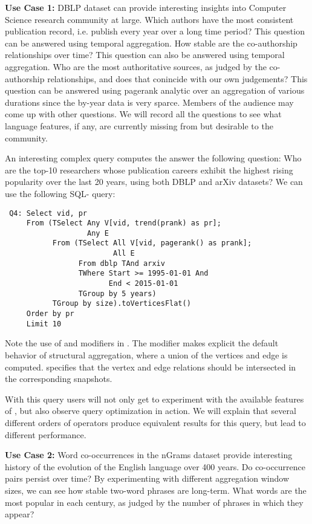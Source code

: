 {\bf Use Case 1:} DBLP dataset can provide interesting insights into
Computer Science research community at large.  Which authors have the
most consistent publication record, i.e. publish every year over a
long time period? This question can be answered using temporal
aggregation.  How stable are the co-authorship relationships over
time? This question can also be answered using temporal aggregation.
Who are the most authoritative sources, as judged by the co-authorship
relationships, and does that conincide with our own judgements?  This
question can be answered using pagerank analytic over an aggregation
of various durations since the by-year data is very sparce.  Members
of the audience may come up with other questions.  We will record all
the questions to see what language features, if any, are currently
missing from \ql but desirable to the community.

An interesting complex query computes the answer the following
question: Who are the top-10 researchers whose publication careers
exhibit the highest rising popularity over the last 20 years, using
both DBLP and arXiv datasets?  We can use the following SQL-\ql
query:

\begin{small}
\begin{verbatim}
 Q4: Select vid, pr
     From (TSelect Any V[vid, trend(prank) as pr];
                   Any E
           From (TSelect All V[vid, pagerank() as prank]; 
                         All E
                 From dblp TAnd arxiv
                 TWhere Start >= 1995-01-01 And
                        End < 2015-01-01
                 TGroup by 5 years)
           TGroup by size).toVerticesFlat()
     Order by pr
     Limit 10
\end{verbatim}
\end{small}

Note the use of  and  modifiers in .
The  modifier makes explicit the default behavior of
structural aggregation, where a union of the vertices and edge is
computed.   specifies that the vertex and edge relations
should be intersected in the corresponding snapshots.

With this query users will not only get to experiment with the
available features of \ql, but also observe query optimization in
action.  We will explain that several different orders of operators
produce equivalent results for this query, but lead to different
performance.

{\bf Use Case 2:} Word co-occurrences in the nGrams dataset provide
interesting history of the evolution of the English language over 400
years.  Do co-occurrence pairs persist over time?  By experimenting
with different aggregation window sizes, we can see how stable
two-word phrases are long-term.  What words are the most popular in
each century, as judged by the number of phrases in which they appear?

